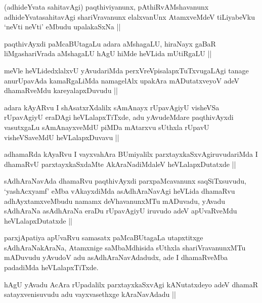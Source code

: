 \begin{artha}
(adhideYvata sahitavAgi) paqthiviyanunx, pAthiRvAMshavanunx
  adhideYvatasahitavAgi shariVravanunx elalxvanUnx AtamxveMdeV
  tiLiyabeVku `neVti neVti' eMbudu upalakaSxNa ||
\end{artha}

\begin{artha}
paqthivAyxdi paMcaBUtagaLu adara aMshagaLU, hiraNayx gaBaR
liMgashariVrada aMshagaLU hAgU hiMde heVLida mUtiRgaLU ||
\end{artha}

\begin{artha}
meVle heVLidedxlalxvU yAvudariMda perxVreVpisalapxTuTxvugaLAgi tanage
anurUpavAda kamaRgaLiMda namagelAlx upakAra mADutatxveyoV adeV
dhamaRveMdu kareyalapxDuvudu ||
\end{artha}

\begin{artha}
adara kAyARvu I shAsatxrXdalilx sAmAnayx rUpavAgiyU visheVSa
rUpavAgiyU eraDAgi heVLalapxTiTxde, adu yAvudeMdare paqthivAyxdi
vasutxgaLu sAmAnayxveMdU piMDa mAtarxvu sUthxla rUpavU visheVSaveMdU
heVLalapxDuvavu ||
\end{artha}

\begin{artha}
adhamaRda kAyaRvu I vayxvahAra BUmiyalilx parxtayxkaSxvAgiruvudariMda
I dhamaRvU parxtayxkaSxdaMte AkAraNadiMdaleV heVLalapxDutatxde ||
\end{artha}

\begin{artha}
sAdhAraNavAda dhamaRvu paqthivAyxdi parxpaMcavanunx saqSiTxsuvudu,
`yashAcxyamf' eMba vAkayxdiMda asAdhAraNavAgi heVLida dhamaRvu
adhAyxtamxveMbudu namamx deVhavanunxMTu mADuvadu, yAvadu sAdhAraNa
asAdhAraNa  eraDu rUpavAgiyU iruvudo adeV apUvaRveMdu
heVLalapxDutatxde ||
\end{artha}

\begin{artha}
parxjApatiya apUvaRvu samasatx paMcaBUtagaLa utapxtitxge
sAdhAraNakAraNa, Atamxnige saMbaMdhisida sUthxla shariVravanunxMTu
mADuvudu yAvudoV adu asAdhAraNavAdadudx, ade I dhamaRveMba padadiMda heVLalapxTiTxde.
\end{artha}


\begin{artha}
hAgU yAvadu AcAra rUpadalilx parxtayxkaSxvAgi kANutatxdeyo adeV dhamaR
satayxvenisuvudu adu vayxvasethxge kAraNavAdadu ||
\end{artha}

